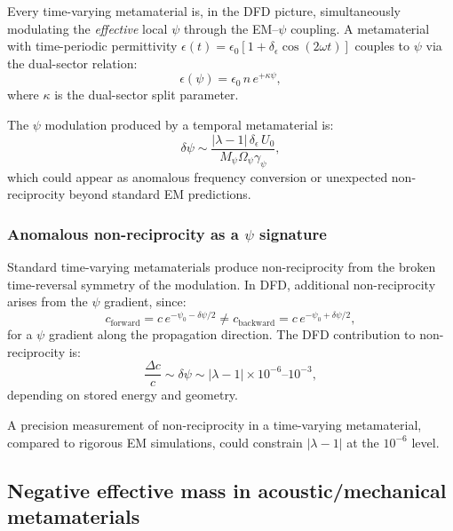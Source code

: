 \documentclass[12pt,aps,prd,twocolumn,superscriptaddress,nofootinbib]{revtex4-2}
\newcommand{\Opsi}{\Omega_\psi}
\newcommand{\gpsi}{\gamma_\psi}
\newcommand{\Mpsi}{M_\psi}
\begin{document}
Every time-varying metamaterial is, in the DFD picture, simultaneously
modulating the \emph{effective} local $\psi$ through the EM--$\psi$
coupling.  A metamaterial with time-periodic permittivity
$\epsilon(t) = \epsilon_0[1 + \delta_\epsilon\cos(2\omega t)]$
couples to $\psi$ via the dual-sector relation:
\begin{equation}
  \epsilon(\psi) = \epsilon_0\,n\,e^{+\kappa\psi},
  \label{eq:eps_psi}
\end{equation}
where $\kappa$ is the dual-sector split parameter.

The $\psi$ modulation produced by a temporal metamaterial is:
\begin{equation}
  \delta\psi \sim \frac{|\lambda - 1|\,\delta_\epsilon\,U_0}
    {\Mpsi\Opsi\gpsi},
  \label{eq:metamaterial_psi}
\end{equation}
which could appear as anomalous frequency conversion or unexpected
non-reciprocity beyond standard EM predictions.

\subsubsection{Anomalous non-reciprocity as a $\psi$ signature}

Standard time-varying metamaterials produce non-reciprocity from the
broken time-reversal symmetry of the modulation.  In DFD, additional
non-reciprocity arises from the $\psi$ gradient, since:
\begin{equation}
  c_{\mathrm{forward}} = c\,e^{-\psi_0 - \delta\psi/2}
  \neq c_{\mathrm{backward}} = c\,e^{-\psi_0 + \delta\psi/2},
  \label{eq:nonreciprocal}
\end{equation}
for a $\psi$ gradient along the propagation direction.  The DFD
contribution to non-reciprocity is:
\begin{equation}
  \frac{\Delta c}{c} \sim \delta\psi \sim |\lambda - 1|\times 10^{-6}
  \text{--}10^{-3},
  \label{eq:nonrecip_estimate}
\end{equation}
depending on stored energy and geometry.

A precision measurement of non-reciprocity in a time-varying
metamaterial, compared to rigorous EM simulations, could constrain
$|\lambda - 1|$ at the $10^{-6}$ level.

\subsection{Negative effective mass in acoustic/mechanical metamaterials}
\label{sec:neg_mass}
\end{document}
